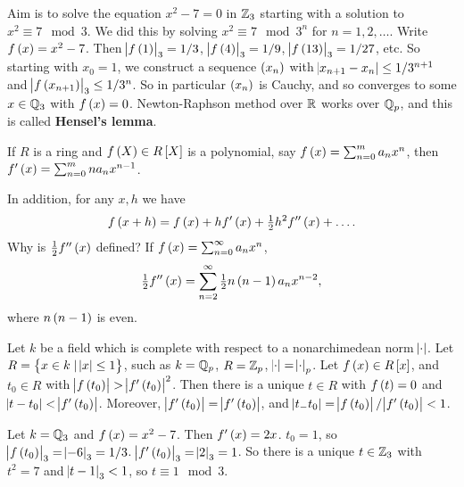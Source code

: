 Aim is to solve the equation $ x^2 - 7 = 0 $ in $ \mathbb{Z}_3 $ starting with a solution to $ x^2 \equiv 7 \mod 3 $. We did this by solving $ x^2 \equiv 7 \mod 3^n $ for $ n = 1, 2, \dots $. Write $ f\br{x} = x^2 - 7 $. Then $ \abs{f\br{1}}_3 = 1 / 3 $, $ \abs{f\br{4}}_3 = 1 / 9 $, $ \abs{f\br{13}}_3 = 1 / 27 $, etc. So starting with $ x_0 = 1 $, we construct a sequence $ \br{x_n} $ with $ \abs{x_{n + 1} - x_n} \le 1 / 3^{n + 1} $ and $ \abs{f\br{x_{n + 1}}}_3 \le 1 / 3^n $. So in particular $ \br{x_n} $ is Cauchy, and so converges to some $ x \in \mathbb{Q}_3 $ with $ f\br{x} = 0 $. Newton-Raphson method over $ \mathbb{R} $ works over $ \mathbb{Q}_p $, and this is called \textbf{Hensel's lemma}.

\begin{definition}
If $ R $ is a ring and $ f\br{X} \in R\sbr{X} $ is a polynomial, say $ f\br{x} = \sum_{n = 0}^m a_nx^n $, then $ f'\br{x} = \sum_{n = 0}^m na_nx^{n - 1} $.
\end{definition}

In addition, for any $ x, h $ we have
$$ f\br{x + h} = f\br{x} + hf'\br{x} + \tfrac{1}{2}h^2f''\br{x} + \dots. $$
Why is $ \tfrac{1}{2}f''\br{x} $ defined? If $ f\br{x} = \sum_{n = 0}^\infty a_nx^n $,
$$ \tfrac{1}{2}f''\br{x} = \sum_{n = 2}^\infty \tfrac{1}{2}n\br{n - 1}a_nx^{n - 2}, $$
where $ n\br{n - 1} $ is even.

\begin{theorem}
Let $ k $ be a field which is complete with respect to a nonarchimedean norm $ \abs{\cdot} $. Let $ R = \cbr{x \in k \mid \abs{x} \le 1} $, such as $ k = \mathbb{Q}_p $, $ R = \mathbb{Z}_p $, $ \abs{\cdot} = \abs{\cdot}_p $. Let $ f\br{x} \in R\sbr{x} $, and $ t_0 \in R $ with $ \abs{f\br{t_0}} > \abs{f'\br{t_0}}^2 $. Then there is a unique $ t \in R $ with $ f\br{t} = 0 $ and $ \abs{t - t_0} < \abs{f'\br{t_0}} $. Moreover, $ \abs{f'\br{t_0}} = \abs{f'\br{t_0}} $, and $ \abs{t_- t_0} = \abs{f\br{t_0}} / \abs{f'\br{t_0}} < 1 $.
\end{theorem}

\begin{example*}
Let $ k = \mathbb{Q}_3 $ and $ f\br{x} = x^2 - 7 $. Then $ f'\br{x} = 2x $. $ t_0 = 1 $, so $ \abs{f\br{t_0}}_3 = \abs{-6}_3 = 1/ 3 $. $ \abs{f'\br{t_0}}_3 = \abs{2}_3 = 1 $. So there is a unique $ t \in \mathbb{Z}_3 $ with $ t^2 = 7 $ and $ \abs{t - 1}_3 < 1 $, so $ t \equiv 1 \mod 3 $.
\end{example*}

